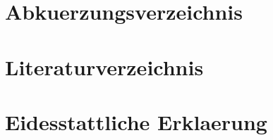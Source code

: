 \documentclass{wseminar}
\begin{document}
\begin{sloppypar}
	
	
	\section{Abkuerzungsverzeichnis}
        \printunsrtglossaries %
	\pagebreak
	
	
	
	\section{Literaturverzeichnis}
        \printbibliography  %
	\pagebreak
	
	
	
	\section{Eidesstattliche Erklaerung}	
	
	\pagebreak
\end{sloppypar}
\end{document}
